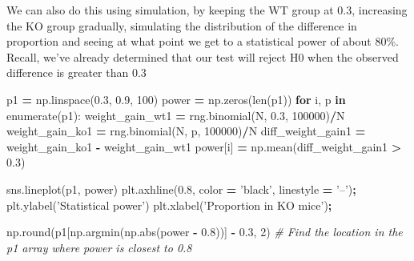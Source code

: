 \documentclass[
  letterpaper,
]{scrbook}
\newenvironment{Shaded}{\begin{snugshade}}{\end{snugshade}}
\newcommand{\BuiltInTok}[1]{#1}
\newcommand{\CommentTok}[1]{\textcolor[rgb]{0.56,0.35,0.01}{\textit{#1}}}
\newcommand{\ControlFlowTok}[1]{\textcolor[rgb]{0.13,0.29,0.53}{\textbf{#1}}}
\newcommand{\DecValTok}[1]{\textcolor[rgb]{0.00,0.00,0.81}{#1}}
\newcommand{\FloatTok}[1]{\textcolor[rgb]{0.00,0.00,0.81}{#1}}
\newcommand{\KeywordTok}[1]{\textcolor[rgb]{0.13,0.29,0.53}{\textbf{#1}}}
\newcommand{\NormalTok}[1]{#1}
\newcommand{\OperatorTok}[1]{\textcolor[rgb]{0.81,0.36,0.00}{\textbf{#1}}}
\newcommand{\StringTok}[1]{\textcolor[rgb]{0.31,0.60,0.02}{#1}}
\begin{document}
We can also do this using simulation, by keeping the WT group at 0.3, increasing the KO group gradually, simulating the distribution of the difference in proportion and seeing at what point we get to a statistical power of about 80\%. Recall, we've already determined that our test will reject H0 when the observed difference is greater than 0.3

\begin{Shaded}
\begin{Highlighting}[]
\NormalTok{p1 }\OperatorTok{=}\NormalTok{ np.linspace(}\FloatTok{0.3}\NormalTok{, }\FloatTok{0.9}\NormalTok{, }\DecValTok{100}\NormalTok{)}
\NormalTok{power }\OperatorTok{=}\NormalTok{ np.zeros(}\BuiltInTok{len}\NormalTok{(p1))}
\ControlFlowTok{for}\NormalTok{ i, p }\KeywordTok{in} \BuiltInTok{enumerate}\NormalTok{(p1):}
\NormalTok{    weight_gain_wt1 }\OperatorTok{=}\NormalTok{ rng.binomial(N, }\FloatTok{0.3}\NormalTok{, }\DecValTok{100000}\NormalTok{)}\OperatorTok{/}\NormalTok{N}
\NormalTok{    weight_gain_ko1 }\OperatorTok{=}\NormalTok{ rng.binomial(N, p, }\DecValTok{100000}\NormalTok{)}\OperatorTok{/}\NormalTok{N}
\NormalTok{    diff_weight_gain1 }\OperatorTok{=}\NormalTok{ weight_gain_ko1 }\OperatorTok{-}\NormalTok{ weight_gain_wt1}
\NormalTok{    power[i] }\OperatorTok{=}\NormalTok{ np.mean(diff_weight_gain1 }\OperatorTok{>} \FloatTok{0.3}\NormalTok{)}
\end{Highlighting}
\end{Shaded}

\begin{Shaded}
\begin{Highlighting}[]
\NormalTok{sns.lineplot(p1, power)}
\NormalTok{plt.axhline(}\FloatTok{0.8}\NormalTok{, color }\OperatorTok{=} \StringTok{'black'}\NormalTok{, linestyle }\OperatorTok{=} \StringTok{'--'}\NormalTok{)}\OperatorTok{;}
\NormalTok{plt.ylabel(}\StringTok{'Statistical power'}\NormalTok{)}
\NormalTok{plt.xlabel(}\StringTok{'Proportion in KO mice'}\NormalTok{)}\OperatorTok{;}
\end{Highlighting}
\end{Shaded}

\begin{Shaded}
\begin{Highlighting}[]
\NormalTok{np.}\BuiltInTok{round}\NormalTok{(p1[np.argmin(np.}\BuiltInTok{abs}\NormalTok{(power }\OperatorTok{-} \FloatTok{0.8}\NormalTok{))] }\OperatorTok{-} \FloatTok{0.3}\NormalTok{, }\DecValTok{2}\NormalTok{) }\CommentTok{# Find the location in the p1 array where power is closest to 0.8}
\end{Highlighting}
\end{Shaded}
\end{document}
